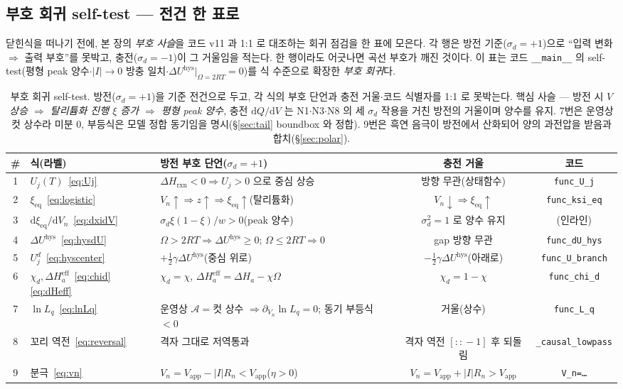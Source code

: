 \documentclass[11pt,a4paper]{article}
\newcommand{\dd}{\mathrm{d}}
\newcommand{\eff}{\mathrm{eff}}
\newcommand{\eq}{\mathrm{eq}}
\newcommand{\app}{\mathrm{app}}
\newcommand{\hys}{\mathrm{hys}}
\newcommand{\rxn}{\mathrm{rxn}}
\newcommand{\code}[1]{\texttt{#1}}
\begin{document}
\subsection{부호 회귀 self-test — 전건 한 표로}\label{sec:signregression}
닫힌식을 떠나기 전에, 본 장의 \emph{부호 사슬}을 코드 v11 과 1:1 로 대조하는 회귀 점검을 한 표에 모은다. 각 행은 방전 기준($\sigma_d=+1$)으로 ``입력 변화 $\Rightarrow$ 출력 부호''를 못박고, 충전($\sigma_d=-1$)이 그 거울임을 적는다. 한 행이라도 어긋나면 곡선 부호가 깨진 것이다. 이 표는 코드 \code{\_\_main\_\_} 의 self-test(평형 peak 양수$\cdot$$|I|\to0$ 방충 일치$\cdot$$\Delta U^\hys|_{\Omega=2RT}=0$)를 식 수준으로 확장한 \emph{부호 회귀}다.

\begin{table}[h]
\centering
\renewcommand{\arraystretch}{1.22}
\begin{tabular}{c l l c c}
\toprule
\# & 식(라벨) & 방전 부호 단언($\sigma_d=+1$) & 충전 거울 & 코드 \\
\midrule
1 & $U_j(T)$~\eqref{eq:Uj} & $\Delta H_\rxn<0\Rightarrow U_j>0$ 으로 중심 상승 & 방향 무관(상태함수) & \code{func\_U\_j} \\
2 & $\xi_\eq$~\eqref{eq:logistic} & $V_n\!\uparrow\Rightarrow z\!\uparrow\Rightarrow\xi_\eq\!\uparrow$(탈리튬화) & $V_n\!\downarrow\Rightarrow\xi_\eq\!\uparrow$ & \code{func\_ksi\_eq} \\
3 & $\dd\xi_\eq/\dd V_n$~\eqref{eq:dxidV} & $\sigma_d\xi(1{-}\xi)/w>0$(peak 양수) & $\sigma_d^2{=}1$ 로 양수 유지 & (인라인) \\
4 & $\Delta U^\hys$~\eqref{eq:hysdU} & $\Omega>2RT\Rightarrow\Delta U^\hys\!\ge\!0$; $\Omega\le2RT\Rightarrow0$ & gap 방향 무관 & \code{func\_dU\_hys} \\
5 & $U_j^d$~\eqref{eq:hyscenter} & $+\tfrac12\gamma\Delta U^\hys$(중심 위로) & $-\tfrac12\gamma\Delta U^\hys$(아래로) & \code{func\_U\_branch} \\
6 & $\chi_d,\Delta H_a^\eff$~\eqref{eq:chid}\eqref{eq:dHeff} & $\chi_d{=}\chi$, $\Delta H_a^\eff{=}\Delta H_a{-}\chi\Omega$ & $\chi_d{=}1{-}\chi$ & \code{func\_chi\_d} \\
7 & $\ln L_q$~\eqref{eq:lnLq} & 운영상 $\mathcal A{=}$컷 상수 $\Rightarrow\partial_{V_n}\!\ln L_q{=}0$; 동기 부등식 $<0$ & 거울(상수) & \code{func\_L\_q} \\
8 & 꼬리 역전~\eqref{eq:reversal} & 격자 그대로 저역통과 & 격자 역전 $[::\!-\!1]$ 후 되돌림 & \code{\_causal\_lowpass} \\
9 & 분극~\eqref{eq:vn} & $V_n{=}V_\app{-}|I|R_n<V_\app$($\eta>0$) & $V_n{=}V_\app{+}|I|R_n>V_\app$ & \code{V\_n=\dots} \\
\bottomrule
\end{tabular}
\caption{부호 회귀 self-test. 방전($\sigma_d=+1$)을 기준 전건으로 두고, 각 식의 부호 단언과 충전 거울$\cdot$코드 식별자를 1:1 로 못박는다. 핵심 사슬 — 방전 시 \emph{$V$ 상승 $\Rightarrow$ 탈리튬화 진행 $\xi$ 증가 $\Rightarrow$ 평형 peak 양수}, 충전 $\dd Q/\dd V$ 는 N1$\cdot$N3$\cdot$N8 의 세 $\sigma_d$ 작용을 거친 방전의 거울이며 양수를 유지. 7번은 운영상 컷 상수라 미분 $0$, 부등식은 모델 정합 동기임을 명시(§\ref{sec:tail} boundbox 와 정합). 9번은 흑연 음극이 방전에서 산화되어 양의 과전압을 받음과 합치(§\ref{sec:polar}).}
\label{tab:signregression}
\end{table}
\end{document}
